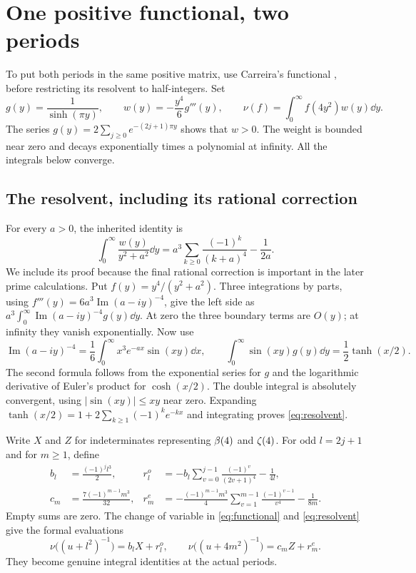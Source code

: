 \section{One positive functional, two periods}\label{sec:moments}
To put both periods in the same positive matrix, use Carreira's
functional \cite[Definition~24 and Lemma~25]{Carreira}, before restricting
its resolvent to half-integers. Set
\begin{equation}\label{eq:functional}
 g(y)=\frac1{\sinh(\pi y)},\qquad
 w(y)=-\frac{y^4}{6}g'''(y),\qquad
 \nu(f)=\int_0^\infty f(4y^2)w(y)\dd y.
\end{equation}
The series $g(y)=2\sum_{j\geq0}e^{-(2j+1)\pi y}$ shows that $w>0$.
The weight is bounded near zero and decays exponentially times a
polynomial at infinity. All the integrals below converge.

\subsection{The resolvent, including its rational correction}
For every $a>0$, the inherited identity is
\begin{equation}\label{eq:resolvent}
 \int_0^\infty\frac{w(y)}{y^2+a^2}\dd y
 =a^3\sum_{k\geq0}\frac{(-1)^k}{(k+a)^4}-\frac1{2a}.
\end{equation}
We include its proof because the final rational correction is important
in the later prime calculations. Put $f(y)=y^4/(y^2+a^2)$. Three
integrations by parts, using
$f'''(y)=6a^3\operatorname{Im}(a-iy)^{-4}$, give the left side as
$a^3\int_0^\infty\operatorname{Im}(a-iy)^{-4}g(y)\dd y$.
At zero the three boundary terms are $O(y)$; at infinity they vanish
exponentially. Now use
\[
 \operatorname{Im}(a-iy)^{-4}
 =\frac16\int_0^\infty x^3e^{-ax}\sin(xy)\dd x,
 \qquad
 \int_0^\infty\sin(xy)g(y)\dd y=\frac12\tanh(x/2).
\]
The second formula follows from the exponential series for $g$ and
the logarithmic derivative of Euler's product for $\cosh(x/2)$.
The double integral is absolutely convergent, using $|\sin(xy)|\leq xy$
near zero. Expanding $\tanh(x/2)=1+2\sum_{k\geq1}(-1)^ke^{-kx}$
and integrating proves \eqref{eq:resolvent}.

Write $X$ and $Z$ for indeterminates representing $\beta(4)$ and $\zeta(4)$.
For odd $l=2j+1$ and for $m\geq1$, define
\begin{align}
 b_l&=\frac{(-1)^jl^3}{2},&
 r_l^o&=-b_l\sum_{v=0}^{j-1}\frac{(-1)^v}{(2v+1)^4}-\frac1{4l},\label{eq:oddcoeff}\\
 c_m&=\frac{7(-1)^{m-1}m^3}{32},&
 r_m^e&=-\frac{(-1)^{m-1}m^3}{4}
       \sum_{v=1}^{m-1}\frac{(-1)^{v-1}}{v^4}-\frac1{8m}.
       \label{eq:evencoeff}
\end{align}
Empty sums are zero. The change of variable in \eqref{eq:functional}
and \eqref{eq:resolvent} give the formal evaluations
\begin{equation}\label{eq:formal-resolvents}
 \nu\bigl((u+l^2)^{-1}\bigr)=b_lX+r_l^o,\qquad
 \nu\bigl((u+4m^2)^{-1}\bigr)=c_mZ+r_m^e.
\end{equation}
They become genuine integral identities at the actual periods.

